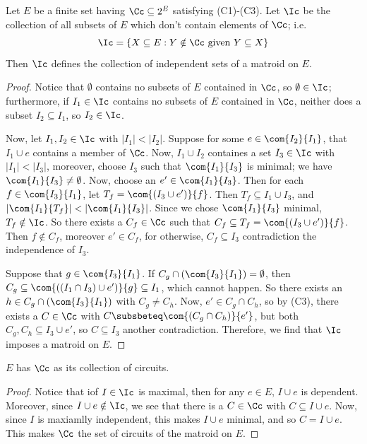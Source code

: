 \begin{theorem}\label{1.1.3}
    Let $E$ be a finite set having  $\Cc \subseteq 2^E$ satisfying (C1)-(C3).
    Let $\Ic$ be the collection of all subsets of $E$ which don't contain
    elements of  $\Cc$; i.e.
    \begin{equation*}
        \Ic=\{X \subseteq E : Y \notin \Cc \text{ given } Y \subseteq X\}
    \end{equation*}
    Then $\Ic$ defines the collection of independent sets of a matroid on $E$.
\end{theorem}
\begin{proof}
    Notice that $\emptyset$ contains no subsets of  $E$ contained in  $\Cc$, so
     $\emptyset \in \Ic$; furthermore, if  $I_1 \in \Ic$ contains no subsets of
     $E$ contained in  $\Cc$, neither does a subset  $I_2 \subseteq I_1$, so
     $I_2 \in \Ic$.

     Now, let $I_1,I_2 \in \Ic$ with $|I_1|<|I_2|$. Suppose for some $e \in
     \com{I_2}{I_1}$, that $I_1 \cup e$ contains a member of $\Cc$. Now,  $I_1
     \cup I_2$ containes a set $I_3 \in \Ic$ with $|I_1|<|I_3|$, moreover,
     choose $I_3$ such that $\com{I_1}{I_3}$ is minimal; we have $\com{I_1}{I_3}
     \neq \emptyset$. Now, choose an $e' \in \com{I_1}{I_3}$. Then for each $f
     \in \com{{I_3}}{I_1}$, let $T_f=\com{(I_3 \cup e')}{f}$. Then $T_f
     \subseteq I_1 \cup I_3$, and $|\com{I_1}{T_f}|<|\com{I_1}{I_3}|$. Since we
     chose $\com{I_1}{I_3}$ minimal, $T_f \notin \Ic$. So there exists a $C_f
     \in \Cc$ such that  $C_f \subseteq T_f=\com{(I_3 \cup e')}{f}$. Then  $f
     \notin C_f$, moreover $e' \in C_f$, for otherwise,  $C_f \subseteq I_3$
     contradiction the independence of $I_3$.

     Suppose that $g \in \com{I_3}{I_1}$. If $C_g \cap (\com{I_3}{I_1})=
     \emptyset$, then $C_g \subseteq \com{((I_1 \cap I_3) \cup e')}{g} \subseteq
     I_1$, which cannot happen. So there exists an $h \in C_g \cap
     (\com{I_3}{I_1})$ with $C_g \neq C_h$. Now,  $e' \in C_g \cap C_h$, so by
     (C3), there exists a $C \in \Cc$ with  $C \subsbeteq \com{(C_g \cap C_h)}
     {e'}$, but both $C_g,C_h \subseteq I_3 \cup e'$, so $C \subseteq I_3$
     another contradiction. Therefore, we find that $\Ic$ imposes a matroid on
     $E$.
\end{proof}
\begin{corollary}
    $E$ has  $\Cc$ as its collection of circuits.
\end{corollary}
\begin{proof}
    Notice that iof $I \in \Ic$ is maximal, then for any $e \in E$,  $I \cup e$
    is  dependent. Moreover, since $I \cup e \notin \Ic$, we see that there is a
     $C \in \Cc$ with  $C \subseteq I \cup e$. Now, since  $I$ is maxiamlly
     independent, this makes  $I \cup e$ minimal, and so  $C = I \cup e$. This
     makes  $\Cc$ the set of circuits of the matroid on $E$.
\end{proof}
